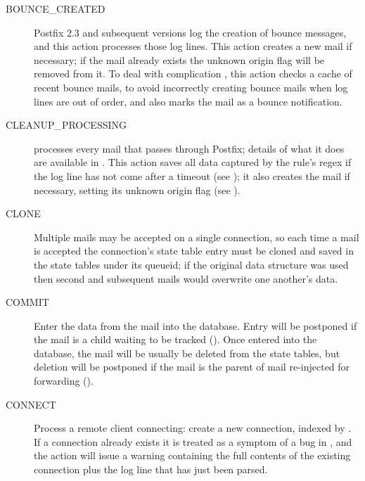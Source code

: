 \begin{description}

    \item [BOUNCE\_CREATED] Postfix 2.3 and subsequent versions log the
        creation of bounce messages, and this action processes those log
        lines.  This action creates a new mail if necessary; if the mail
        already exists the unknown origin flag will be removed from it.  To
        deal with complication , this action checks a
        cache of recent bounce mails, to avoid incorrectly creating bounce
        mails when log lines are out of order, and also marks the mail as a
        bounce notification.

    \item [CLEANUP\_PROCESSING]  processes every mail that
        passes through Postfix; details of what it does are available in
        .  This action saves all data captured
        by the rule's regex if the log line has not come after a timeout
        (see ); it also creates
        the mail if necessary, setting its unknown origin flag (see
        ).

    \item [CLONE] Multiple mails may be accepted on a single connection, so
        each time a mail is accepted the connection's state table entry
        must be cloned and saved in the state tables under its queueid; if
        the original data structure was used then second and subsequent
        mails would overwrite one another's data.

    \item [COMMIT] Enter the data from the mail into the database.  Entry
        will be postponed if the mail is a child waiting to be tracked
        ().  Once entered into the database,
        the mail will be usually be deleted from the state tables, but
        deletion will be postponed if the mail is the parent of mail
        re-injected for forwarding ().

    \item [CONNECT] Process a remote client connecting: create a new
        connection, indexed by  .  If a
        connection already exists it is treated as a symptom of a bug in
        \parsername{}, and the action will issue a warning containing the
        full contents of the existing connection plus the log line that has
        just been parsed.


\end{description}
